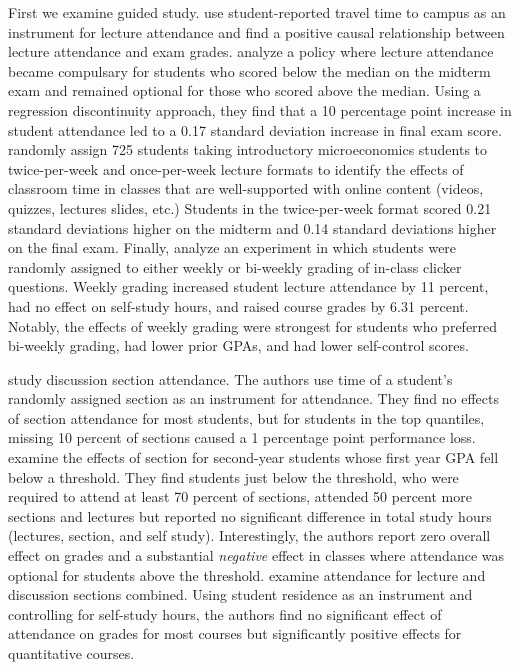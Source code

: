 \documentclass[12pt]{article}
\begin{document}
First we examine guided study. \textcite{km2003} use student-reported travel time to campus as an instrument for lecture attendance and find a positive causal relationship between lecture attendance and exam grades. \textcite{dgm2010} analyze a policy where lecture attendance became compulsary for students who scored below the median on the midterm exam and remained optional for those who scored above the median. Using a regression discontinuity approach, they find that a 10 percentage point increase in student attendance led to a 0.17 standard deviation increase in final exam score. \textcite{jcjao2015} randomly assign 725 students taking introductory microeconomics students to twice-per-week and once-per-week lecture formats to identify the effects of classroom time in classes that are well-supported with online content (videos, quizzes, lectures slides, etc.) Students in the twice-per-week format scored 0.21 standard deviations higher on the midterm and 0.14 standard deviations higher on the final exam. Finally, \textcite{tlad2020} analyze an experiment in which students were randomly assigned to either weekly or bi-weekly grading of in-class clicker questions. Weekly grading increased student lecture attendance by 11 percent, had no effect on self-study hours, and raised course grades by 6.31 percent. Notably, the effects of weekly grading were strongest for students who preferred bi-weekly grading, had lower prior GPAs, and had lower self-control scores. %

\textcite{ans2012} study discussion section attendance. The authors use time of a student's randomly assigned section as an instrument for attendance. They find no effects of section attendance for most students, but for students in the top quantiles, missing 10 percent of sections caused a 1 percentage point performance loss. \textcite{kow2020} examine the effects of section for second-year students whose first year GPA fell below a threshold. They find students just below the threshold, who were required to attend at least 70 percent of sections, attended 50 percent more sections and lectures but reported no significant difference in total study hours (lectures, section, and self study). Interestingly, the authors report zero overall effect on grades and a substantial \textit{negative} effect in classes where attendance was optional for students above the threshold. \textcite{bs2013} examine attendance for lecture and discussion sections combined. Using student residence as an instrument and controlling for self-study hours, the authors find no significant effect of attendance on grades for most courses but significantly positive effects for quantitative courses.
\end{document}
